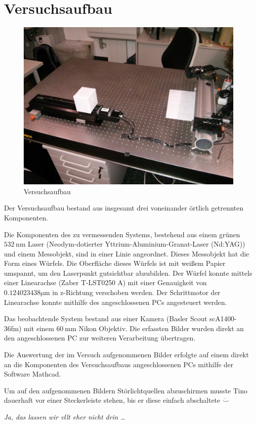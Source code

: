 \section{Versuchsaufbau}

\begin{figure}[h!]
	\centering
	\includegraphics[width=0.8\linewidth]{img/versuchsaufbaufoto.jpg}
	\caption{Versuchsaufbau}
	\label{fig:Versuchsaufbau}
\end{figure}

Der Versuchsaufbau bestand aus insgesamt drei voneinander örtlich getrennten Komponenten. 

Die Komponenten des zu vermessenden Systems, bestehend aus einem grünen $\SI{532}{\nm}$ Laser (Neodym-dotierter Yttrium-Aluminium-Granat-Laser (Nd:YAG)) und einem Messobjekt, sind in einer Linie angeordnet. Dieses Messobjekt hat die Form eines Würfels. Die Oberfläche dieses Würfels ist mit weißem Papier umspannt, um den Laserpunkt gutsichtbar abzubilden. Der Würfel konnte mittels einer Linearachse (Zaber T-LST0250 A) mit einer Genauigkeit von $0.124023438 \si{\micro\meter}$ in z-Richtung verschoben werden. Der Schrittmotor der Linearachse konnte mithilfe des angeschlossenen PCs angesteuert werden.

Das beobachtende System bestand aus einer Kamera (Basler Scout scA1400-36fm) mit einem $\SI{60}{\mm}$ Nikon Objektiv. Die erfassten Bilder wurden direkt an den angeschlossenen PC zur weiteren Verarbeitung übertragen.

Die Auswertung der im Versuch aufgenommenen Bilder erfolgte auf einem direkt an die Komponenten des Versuchsaufbaus angeschlossenen PCs mithilfe der Software Mathcad.

Um auf den aufgenommenen Bildern Störlichtquellen abzuschirmen musste Tino dauerhaft vor einer Steckerleiste stehen, bis er diese einfach abschaltete $\ddot\smile$

\emph{Ja, das lassen wir vllt eher nicht drin \ldots}